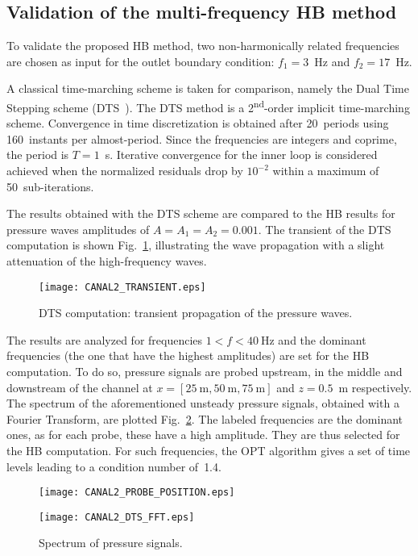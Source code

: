 \subsection{Validation of the multi-frequency HB method}

To validate the proposed HB method, two non-harmonically related
frequencies are chosen as input for the outlet boundary condition:
$f_1 = 3$~Hz and $f_2 = 17$~Hz.

A classical time-marching scheme is taken for comparison, namely the
Dual Time Stepping scheme (DTS~\cite{Jameson1991}).  The DTS method is
a 2\textsuperscript{nd}-order implicit time-marching scheme.
Convergence in time discretization is obtained after 20~periods using
160~instants per almost-period. Since the frequencies are integers and
coprime, the period is $T=1$~s.  Iterative convergence for the
inner loop is considered achieved when the normalized residuals drop
by $10^{-2}$ within a maximum of 50~sub-iterations.

The results obtained with the DTS scheme are compared to the HB
results for pressure waves amplitudes of $A = A_1 = A_2 = 0.001$.  The
transient of the DTS computation is shown
Fig.~\ref{fig:canal2_transient}, illustrating the wave propagation
with a slight attenuation of the high-frequency waves.
\begin{figure}[htbp]
  \centering
  \texttt{[image: CANAL2\_TRANSIENT.eps]}
  \caption{DTS computation: transient propagation of the pressure waves.}
  \label{fig:canal2_transient}
\end{figure}


The results are analyzed for frequencies $1<f< 40~\textrm{Hz}$ and the
dominant frequencies (the one that have the highest amplitudes) are
set for the HB computation.  To do so, pressure signals are probed
upstream, in the middle and downstream of the channel at
$x=[25~\textrm{m}, 50~\textrm{m}, 75~\textrm{m}]$ and $z=0.5$~m
respectively.  The spectrum of the aforementioned unsteady pressure
signals, obtained with a Fourier Transform, are plotted
Fig.~\ref{fig:canal2_dts_fft}.  The labeled frequencies are the
dominant ones, as for each probe, these have a high amplitude. They
are thus selected for the HB computation.  For such frequencies, the
OPT algorithm gives a set of time levels leading to a condition number
of~1.4.
\begin{figure}[htb]
  \centering
  \texttt{[image: CANAL2\_PROBE\_POSITION.eps]}

  \vspace{1em}

  \texttt{[image: CANAL2\_DTS\_FFT.eps]}
  \caption{Spectrum of pressure signals.}
  \label{fig:canal2_dts_fft}
\end{figure}

